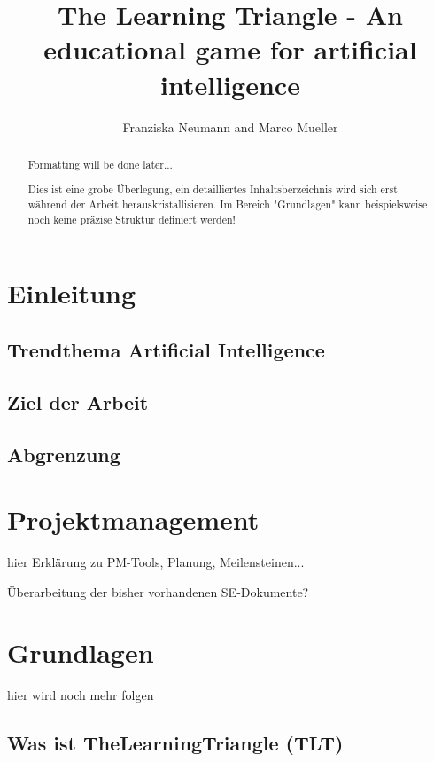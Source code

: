 \documentclass[a4paper]{article}
\title{The Learning Triangle - An educational game for artificial intelligence}
\author{Franziska Neumann and Marco Mueller}
\begin{document}
\maketitle

\begin{abstract}
Formatting will be done later...

Dies ist eine grobe Überlegung, ein detailliertes Inhaltsberzeichnis wird sich erst während der Arbeit herauskristallisieren. Im Bereich "Grundlagen" kann beispielsweise noch keine präzise Struktur definiert werden!
\end{abstract}

\newpage
\tableofcontents
\newpage

\section{Einleitung}

\subsection{Trendthema Artificial Intelligence}

\subsection{Ziel der Arbeit}

\subsection{Abgrenzung}

\section{Projektmanagement}

hier Erklärung zu PM-Tools, Planung, Meilensteinen...

Überarbeitung der bisher vorhandenen SE-Dokumente?

\section{Grundlagen}

hier wird noch mehr folgen

\subsection{Was ist TheLearningTriangle (TLT)}
\end{document}
